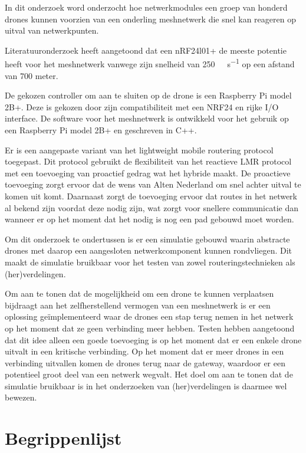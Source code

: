 \documentclass[a4paper, 11pt, oneside]{report}
\begin{document}
In dit onderzoek word onderzocht hoe netwerkmodules een groep van honderd drones kunnen voorzien van een onderling meshnetwerk die snel kan reageren op uitval van netwerkpunten.

Literatuuronderzoek heeft aangetoond dat een nRF24l01+ de meeste potentie heeft voor het meshnetwerk vanwege zijn snelheid van \SI{250}{\kilo\bit\per\second} op een afstand van 700 meter.

De gekozen controller om aan te sluiten op de drone is een Raspberry Pi model 2B+. Deze is gekozen door zijn compatibiliteit met een NRF24 en rijke I/O interface. 
De software voor het meshnetwerk is ontwikkeld voor het gebruik op een Raspberry Pi model 2B+ en geschreven in C++.   

Er is een aangepaste variant van het lightweight mobile routering protocol toegepast. Dit protocol gebruikt de flexibiliteit van het reactieve LMR protocol met een toevoeging van proactief gedrag wat het hybride maakt. De proactieve toevoeging zorgt ervoor dat de wens van Alten Nederland om snel achter uitval te komen uit komt. Daarnaast zorgt de toevoeging ervoor dat routes in het netwerk al bekend zijn voordat deze nodig zijn, wat zorgt voor snellere communicatie dan wanneer er op het moment dat het nodig is nog een pad gebouwd moet worden.

Om dit onderzoek te ondertussen is er een simulatie gebouwd waarin abstracte drones met daarop een aangesloten netwerkcomponent kunnen rondvliegen. Dit maakt de simulatie bruikbaar voor het testen van zowel routeringstechnieken als (her)verdelingen. 

Om aan te tonen dat de mogelijkheid om een drone te kunnen verplaatsen bijdraagt aan het zelfherstellend vermogen van een meshnetwerk is er een oplossing geïmplementeerd waar de drones een stap terug nemen in het netwerk op het moment dat ze geen verbinding meer hebben.  Testen hebben aangetoond dat dit idee alleen een goede toevoeging is op het moment dat er een enkele drone uitvalt in een kritische verbinding. Op het moment dat er meer drones in een verbinding uitvallen komen de drones terug naar de gateway, waardoor er een potentieel groot deel van een netwerk wegvalt. Het doel om aan te tonen dat de simulatie bruikbaar is in het onderzoeken van (her)verdelingen is daarmee wel bewezen.

\tableofcontents
\clearpage


\chapter*{Begrippenlijst}
\label{inleiding:begrippenlijst}
\end{document}
